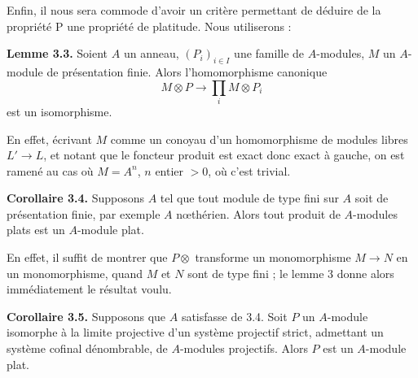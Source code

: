 \documentclass[11pt,a4paper]{article}
\begin{document}



Enfin, il nous sera commode d'avoir un critère permettant de déduire de la
propriété P une propriété de platitude. Nous utiliserons :

\textbf{Lemme 3.3.} Soient $A$ un anneau, $(P_i)_{i \in I}$ une famille de
$A$-modules,  $M$ un $A$-module de présentation finie.
Alors l'homomorphisme canonique
\[
  M \otimes P \longrightarrow \prod_i M \otimes P_i
\]
est un isomorphisme.

En effet, écrivant $M$ comme  un conoyau d'un homomorphisme de
modules libres  $L' \to L$, et notant que le foncteur
produit est exact donc exact à gauche, on est ramené au cas où $M = A^n$, $n$
entier $> 0$, où c'est trivial.

\textbf{Corollaire 3.4.} Supposons $A$ tel que tout module de type fini sur
$A$ soit de présentation finie, par exemple $A$ nœthérien. Alors tout produit
de $A$-modules plats est un $A$-module plat.

En effet, il suffit de montrer que $P \otimes$ transforme un monomorphisme
$M \to N$ en un monomorphisme, quand $M$ et $N$ sont de type fini ; le lemme 3
donne alors immédiatement le résultat voulu.

\textbf{Corollaire 3.5.} Supposons que $A$ satisfasse 
 de 3.4.  Soit $P$ un $A$-module
 isomorphe à  la limite projective
 d'un système projectif strict,  admettant un
système cofinal dénombrable, de $A$-modules projectifs. Alors $P$ est un
$A$-module plat.
\end{document}
